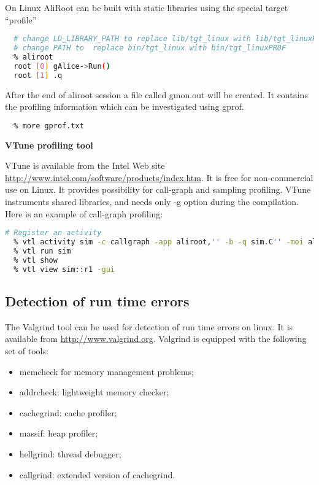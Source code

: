 \documentclass[12pt,a4paper,twoside]{article}
\begin{document}
On Linux AliRoot can be built with static libraries using the special
target ``profile''

\begin{lstlisting}[language=sh]
  % make profile
  # change LD_LIBRARY_PATH to replace lib/tgt_linux with lib/tgt_linuxPROF
  # change PATH to  replace bin/tgt_linux with bin/tgt_linuxPROF
  % aliroot
  root [0] gAlice->Run()
  root [1] .q
\end{lstlisting}

After the end of aliroot session a file called gmon.out will be created. It
contains the profiling information which can be investigated using
gprof.

\begin{lstlisting}[language=sh]
  % gprof `which aliroot` | tee gprof.txt
  % more gprof.txt
\end{lstlisting}


\noindent
\textbf{VTune profiling tool}

VTune is available from the Intel Web site
\url{http://www.intel.com/software/products/index.htm}. It is free for
non-commercial use on Linux. It provides possibility for call-graph
and sampling profiling. VTune instruments shared libraries, and needs
only -g option during the compilation. Here is an example of
call-graph profiling:

\begin{lstlisting}[language=sh]
  # Register an activity
  % vtl activity sim -c callgraph -app aliroot,'' -b -q sim.C'' -moi aliroot
  % vtl run sim
  % vtl show
  % vtl view sim::r1 -gui
\end{lstlisting}

\subsection{Detection of run time errors}

The Valgrind tool can be used for detection of run time errors on
linux. It is available from \url{http://www.valgrind.org}.  Valgrind
is equipped with the following set of tools:
\begin{itemize}
\item memcheck for memory management problems;
\item addrcheck: lightweight memory checker;
\item cachegrind: cache profiler;
\item massif: heap profiler;
\item hellgrind: thread debugger;
\item callgrind: extended version of cachegrind.
\end{itemize}
\end{document}
